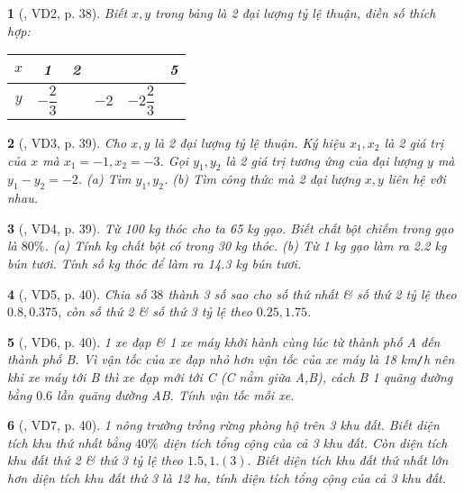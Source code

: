 \documentclass{article}
\newtheorem{baitoan}{}
\begin{document}
\begin{baitoan}[\cite{Binh_boi_duong_Toan_7_tap_1}, VD2, p. 38]
	Biết $x,y$ trong bảng là 2 đại lượng tỷ lệ thuận, điền số thích hợp:
	\begin{table}[H]
		\centering
		\begin{tabular}{|c|c|c|c|c|c|}
			\hline
			$x$ & 1 & 2 & & & 5 \\
			\hline
			$y$ & $-\dfrac{2}{3}$ & & $-2$ & $-2\dfrac{2}{3}$ & \\
			\hline
		\end{tabular}
	\end{table}
\end{baitoan}

\begin{baitoan}[\cite{Binh_boi_duong_Toan_7_tap_1}, VD3, p. 39]
	Cho $x,y$ là 2 đại lượng tỷ lệ thuận. Ký hiệu $x_1,x_2$ là 2 giá trị của $x$ mà $x_1 = -1,x_2 = -3$. Gọi $y_1,y_2$ là 2 giá trị tương ứng của đại lượng $y$ mà $y_1 - y_2 = -2$. (a) Tìm $y_1,y_2$. (b) Tìm công thức mà 2 đại lượng $x,y$ liên hệ với nhau.
\end{baitoan}

\begin{baitoan}[\cite{Binh_boi_duong_Toan_7_tap_1}, VD4, p. 39]
	Từ {\rm100 kg} thóc cho ta {\rm65 kg} gạo. Biết chất bột chiếm trong gạo là $80\%$. (a) Tính {\rm kg} chất bột có trong {\rm30 kg} thóc. (b) Từ {\rm1 kg} gạo làm ra {\rm2.2 kg} bún tươi. Tính số {\rm kg} thóc để làm ra {\rm14.3 kg} bún tươi.
\end{baitoan}

\begin{baitoan}[\cite{Binh_boi_duong_Toan_7_tap_1}, VD5, p. 40]
	Chia số $38$ thành 3 số sao cho số thứ nhất \& số thứ 2 tỷ lệ theo $0.8,0.375$, còn số thứ 2 \& số thứ 3 tỷ lệ theo $0.25,1.75$.
\end{baitoan}

\begin{baitoan}[\cite{Binh_boi_duong_Toan_7_tap_1}, VD6, p. 40]
	1 xe đạp \& 1 xe máy khởi hành cùng lúc từ thành phố A đến thành phố B. Vì vận tốc của xe đạp nhỏ hơn vận tốc của xe máy là {\rm18 km{\tt/}h} nên khi xe máy tới B thì xe đạp mới tới C (C nằm giữa A,B), cách B 1 quãng đường bằng $0.6$ lần quãng đường AB. Tính vận tốc mỗi xe.
\end{baitoan}

\begin{baitoan}[\cite{Binh_boi_duong_Toan_7_tap_1}, VD7, p. 40]
	1 nông trường trồng rừng phòng hộ trên 3 khu đất. Biết diện tích khu thứ nhất bằng $40\%$ diện tích tổng cộng của cả 3 khu đất. Còn diện tích khu đất thứ 2 \& thứ 3 tỷ lệ theo $1.5,1.(3)$. Biết diện tích khu đất thứ nhất lớn hơn diện tích khu đất thứ 3 là {\rm12 ha}, tính diện tích tổng cộng của cả 3 khu đất.
\end{baitoan}
\end{document}

